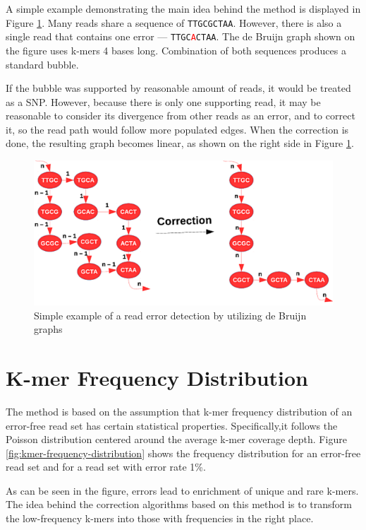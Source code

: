 A simple example demonstrating the main idea behind the method is displayed in Figure \ref{fig:error-correction-db}. Many reads share a sequence of \texttt{TTGCGCTAA}. However, there is also a single read that contains one error --- \texttt{TTGC{\textcolor{red}{A}}CTAA}. The de Bruijn graph shown on the figure uses k-mers 4 bases long. Combination of both sequences produces a standard bubble.

If the bubble was supported by reasonable amount of reads, it would be treated as a SNP. However, because there is only one supporting read, it may be reasonable to consider its divergence from other reads as an error, and to correct it, so the read path would follow more populated edges. When the correction is done, the resulting graph becomes linear, as shown on the right side in Figure \ref{fig:error-correction-db}.

\begin{figure}[h]
	\centering
	\includegraphics{img/error-correction-db.pdf}
	\caption{Simple example of a read error detection by utilizing de Bruijn graphs}
	\label{fig:error-correction-db}
\end{figure}

\section{K-mer Frequency Distribution}
\label{sec:ec-kmer-frequency-distribution}

The method is based on the assumption that k-mer frequency distribution of an error-free read set has certain statistical properties. Specifically,it follows the Poisson distribution centered around the average k-mer coverage depth.  Figure \ref{fig:kmer-frequency-distribution} shows the frequency distribution for an error-free read set and for a read set with error rate 1\%. 

As can be seen in the figure, errors lead to enrichment of unique and rare
k-mers. The idea behind the correction algorithms based on this method is to transform the low-frequency k-mers into those with frequencies in the right place.

